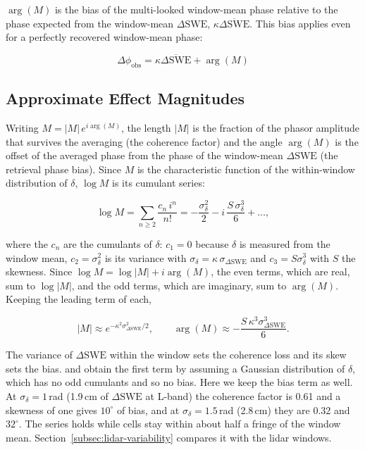 \documentclass[tc, manuscript]{copernicus}
\begin{document}
\noindent $\arg(M)$ is the bias of the multi-looked window-mean phase relative to the phase expected from the window-mean $\Delta\mathrm{SWE}$, $\kappa\overline{\Delta\mathrm{SWE}}$. This bias applies even for a perfectly recovered window-mean phase:

\begin{equation}\label{eq:bias}
    \Delta\phi_\mathrm{obs} = \kappa\overline{\Delta\mathrm{SWE}} + \arg(M)
\end{equation}

\subsection{Approximate Effect Magnitudes}\label{subsec:effect-magnitudes}

Writing $M = |M|\,e^{i\arg(M)}$, the length $|M|$ is the fraction of the phasor amplitude that survives the averaging (the coherence factor) and the angle $\arg(M)$ is the offset of the averaged phase from the phase of the window-mean $\Delta\mathrm{SWE}$ (the retrieval phase bias). Since $M$ is the characteristic function of the within-window distribution of $\delta$, $\log M$ is its cumulant series:

\begin{equation}\label{eq:cumulant_series}
    \log M = \sum_{n \ge 2} \frac{c_n\, i^n}{n!}
           = -\frac{\sigma_\delta^2}{2} - i\,\frac{S\,\sigma_\delta^3}{6} + \dots,
\end{equation}

\noindent where the $c_n$ are the cumulants of $\delta$: $c_1 = 0$ because $\delta$ is measured from the window mean, $c_2 = \sigma_\delta^2$ is its variance with $\sigma_\delta = \kappa\,\sigma_{\Delta\mathrm{SWE}}$ and $c_3 = S\sigma_\delta^3$ with $S$ the skewness. Since $\log M = \log|M| + i\arg(M)$, the even terms, which are real, sum to $\log|M|$, and the odd terms, which are imaginary, sum to $\arg(M)$. Keeping the leading term of each,

\begin{equation}\label{eq:cumulant}
    |M| \approx e^{-\kappa^2 \sigma_{\Delta\mathrm{SWE}}^2/2}, \qquad \arg(M) \approx -\frac{S\,\kappa^3 \sigma_{\Delta\mathrm{SWE}}^3}{6}.
\end{equation}

\noindent The variance of $\Delta\mathrm{SWE}$ within the window sets the coherence loss and its skew sets the bias. \citet{Rott2003} and \citet{yueh2026interferometric-3ba} obtain the first term by assuming a Gaussian distribution of $\delta$, which has no odd cumulants and so no bias. Here we keep the bias term as well. At $\sigma_\delta = 1$\,\unit{rad} (1.9\,\unit{cm} of $\Delta\mathrm{SWE}$ at L-band) the coherence factor is 0.61 and a skewness of one gives $10^\circ$ of bias, and at $\sigma_\delta =1.5$\,\unit{rad} (2.8\,\unit{cm}) they are 0.32 and $32^\circ$. The series holds while cells stay within about half a fringe of the window mean. Section~\ref{subsec:lidar-variability} compares it with the lidar windows.
\end{document}

